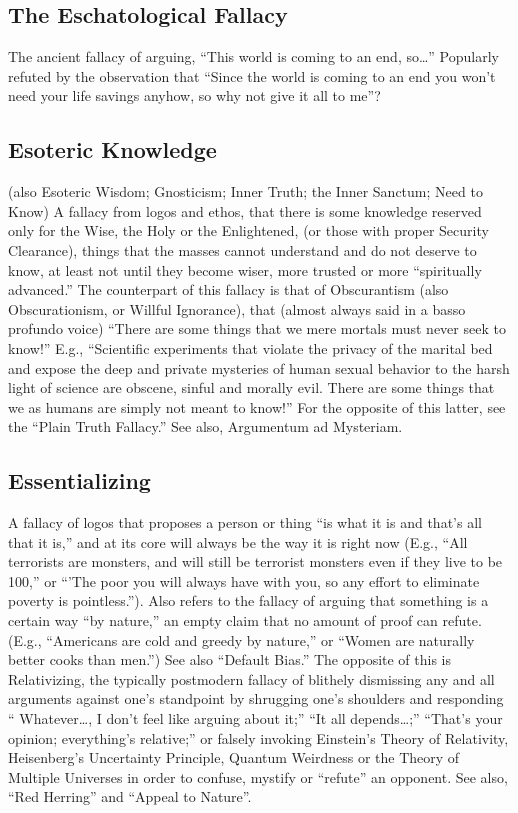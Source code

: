 \documentclass[10pt,a4paper,british]{article}
\begin{document}
\begin{multicols}{2}
    \subsection{The Eschatological Fallacy} The ancient fallacy of arguing, ``This world is coming to an end, so\ldots''  Popularly refuted by the observation that ``Since the world is coming to an end you won't need your life savings anyhow, so why not give it all to me''?  

	\subsection{Esoteric Knowledge} (also Esoteric Wisdom; Gnosticism; Inner Truth; the Inner Sanctum; Need to Know) A fallacy from logos and ethos, that there is some knowledge reserved only for the Wise, the Holy or the Enlightened, (or those with proper Security Clearance), things that the masses cannot understand and do not deserve to know, at least not until they become wiser, more trusted or more ``spiritually advanced.''  The counterpart of this fallacy is that of Obscurantism (also Obscurationism, or Willful Ignorance), that (almost always said in a basso profundo voice) ``There are some things that we mere mortals must never seek to know!'' E.g., ``Scientific experiments that violate the privacy of the marital bed and expose  the deep and private mysteries of human sexual behavior to the harsh light of science are obscene, sinful and morally evil. There are some things that we as humans are simply not meant to know!'' For the opposite of this latter, see the ``Plain Truth Fallacy.'' See also, Argumentum ad Mysteriam.  

    \subsection{Essentializing} A fallacy of logos that proposes a person or thing “is what it is and that’s all that it is,” and at its core will always be the way it is right now (E.g., ``All terrorists are monsters, and will still be terrorist monsters even if they live to be 100,'' or ``'The poor you will always have with you, so any effort to eliminate poverty is pointless.''). Also refers to the fallacy of arguing that something is a certain way ``by nature,'' an empty claim that no amount of proof can refute. (E.g., ``Americans are cold and greedy by nature,'' or ``Women are naturally better cooks than men.'') See also ``Default Bias.''  The opposite of this is Relativizing, the typically postmodern fallacy of blithely dismissing any and all arguments against one's standpoint by shrugging one's shoulders and responding `` Whatever\ldots, I don't feel like arguing about it;'' ``It all depends\ldots;'' ``That's your opinion; everything's relative;'' or falsely invoking Einstein's Theory of Relativity, Heisenberg's Uncertainty Principle, Quantum Weirdness or the Theory of Multiple Universes in order to confuse, mystify or ``refute'' an opponent. See also, ``Red Herring'' and  ``Appeal to Nature''.  


\end{multicols}
\end{document}
